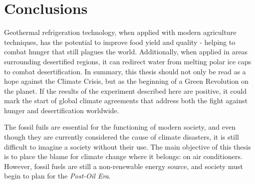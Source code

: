 \chapter[Conclusions]{Conclusions}

Geothermal refrigeration technology, when applied with modern agriculture techniques, has the potential to improve food yield and quality - helping to combat hunger that still plagues the world. Additionally, when applied in areas surrounding desertified regions, it can redirect water from melting polar ice caps to combat desertification. In summary, this thesis should not only be read as a hope against the Climate Crisis, but as the beginning of a Green Revolution on the planet. If the results of the experiment described here are positive, it could mark the start of global climate agreements that address both the fight against hunger and desertification worldwide.

The fossil fuils are essential for the functioning of modern society, and even though they are currently considered the cause of climate disasters, it is still difficult to imagine a society without their use. The main objective of this thesis is to place the blame for climate change where it belongs: on air conditioners. However, fossil fuels are still a non-renewable energy source, and society must begin to plan for the \textit{Post-Oil Era}.